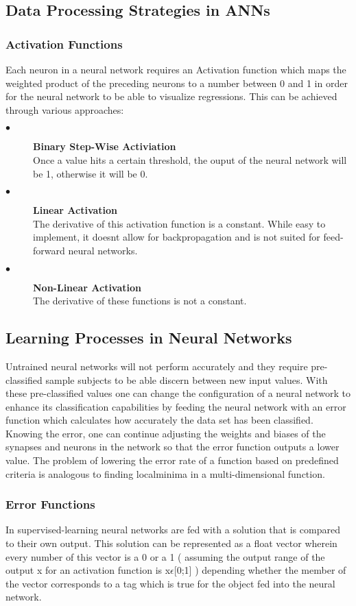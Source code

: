 \subsection{Data Processing Strategies in ANNs}
\subsubsection{Activation Functions}
Each neuron in a neural network requires an Activation function which maps the weighted product of the preceding neurons to a number between 0 and 1 in order for the neural network to be able to visualize regressions. This can be achieved through various approaches:
\begin{description}
\item[$\bullet$] \textbf{Binary Step-Wise Activiation}\\
Once a value hits a certain threshold, the ouput of the neural network will be 1, otherwise it will be 0.
\item[$\bullet$] \textbf{Linear Activation}\\
The derivative of this activation function is a constant. While easy to implement, it doesnt allow for backpropagation and is not suited for feed-forward neural networks.
\item[$\bullet$] \textbf{Non-Linear Activation}\\
The derivative of these functions is not a constant.
\end{description}
\subsection{Learning Processes in Neural Networks}
Untrained neural networks will not perform accurately and they require pre-classified sample subjects to be able discern between new input values. With these pre-classified values one can change the configuration of a neural network to enhance its classification capabilities by feeding the neural network with an error function which calculates how accurately the data set has been classified. Knowing the error, one can continue adjusting the weights and biases of the synapses and neurons in the network so that the error function outputs a lower value.
The problem of lowering the error rate of a function based on predefined criteria is analogous to finding localminima in a multi-dimensional function.
\subsubsection{Error Functions}
In supervised-learning neural networks are fed with a solution that is compared to their own output. This solution can be represented as a float vector wherein every number of this vector is a 0 or a 1 ( assuming the output range of the output x for an activation function is x$\epsilon$[0;1] ) depending whether the member of the vector corresponds to a tag which is true for the object fed into the neural network.

